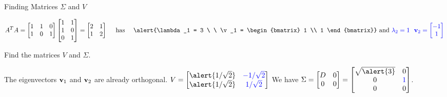 \documentclass[xcolor=dvipsnames,aspectratio=169,t]{beamer}
\begin{document}
\begin{frame}{Finding Matrices $\Sigma$ and $V$}

  \[ A^TA = \begin{bmatrix} 1 & 1 & 0 \\ 1 & 0 & 1 \end{bmatrix} \begin{bmatrix} 1 & 1 \\ 1 & 0 \\ 0 & 1 \end{bmatrix} = \begin{bmatrix} 2 & 1 \\ 1 & 2 \end{bmatrix}  \quad \mbox{ has } \quad \alert{\lambda_1 = 3 \ \ \v_1 = \begin{bmatrix} 1 \\ 1 \end{bmatrix}} \mbox{ and } \colorb{\lambda_2 = 1 \ \ \v_2 = \begin{bmatrix} -1 \\ 1 \end{bmatrix}} \]

  \bb
  \addtocounter{enumi}{1}
  \ii \alert{Find the matrices $V$ and $\Sigma$.}
  \ee

  \bi
  \ii The eigenvectors $\mathbf{v}_1$ and $\mathbf{v}_2$ are already orthogonal. $V = \begin{bmatrix} \alert{1/\sqrt{2}} & \colorb{-1/\sqrt{2}} \\ \alert{1/\sqrt{2}} &  \colorb{1/\sqrt{2}} \end{bmatrix}$
  \ii We have $\Sigma = \begin{bmatrix} D & 0 \\ 0 & 0 \\ \end{bmatrix} = \begin{bmatrix} \sqrt{\alert{3}} & 0 \\ 0 & \colorb{1} \\ 0 & 0 \end{bmatrix}$.
  \ei
\end{frame}
\end{document}
